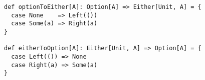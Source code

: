 \begin{algorithm}

\begin{verbatim}
def optionToEither[A]: Option[A] => Either[Unit, A] = {
  case None    => Left(())
  case Some(a) => Right(a)
}

def eitherToOption[A]: Either[Unit, A] => Option[A] = {
  case Left(()) => None
  case Right(a) => Some(a)
}
\end{verbatim}

\caption{ with  as error type is isomorphic to  %
\label{isomorphism}}
\end{algorithm}